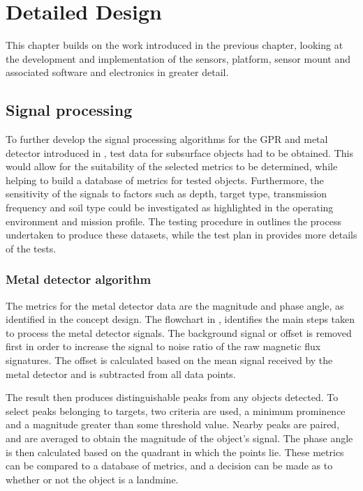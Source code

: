\documentclass[main.tex]{subfiles}
\begin{document}
\chapter{Detailed Design}

This chapter builds on the work introduced in the previous chapter, looking at the development and implementation of the sensors, platform, sensor mount and associated software and electronics in greater detail. 

\section{Signal processing}
To further develop the signal processing algorithms for the GPR and metal detector introduced in , test data for subsurface objects had to be obtained. This would allow for the suitability of the selected metrics to be determined, while helping to build a database of metrics for tested objects. Furthermore, the sensitivity of the signals to factors such as depth, target type, transmission frequency and soil type could be investigated as highlighted in the operating environment and mission profile. The testing procedure in  outlines the process undertaken to produce these datasets, while the test plan in  provides more details of the tests. 

\subsection{Metal detector algorithm}
The metrics for the metal detector data are the magnitude and phase angle, as identified in the concept design. The flowchart in , identifies the main steps taken to process the metal detector signals. The background signal or offset is removed first in order to increase the signal to noise ratio of the raw magnetic flux signatures. The offset is calculated based on the mean signal received by the metal detector and is subtracted from all data points. 

The result then produces distinguishable peaks from any objects detected. To select peaks belonging to targets, two criteria are used, a minimum prominence and a magnitude greater than some threshold value. Nearby peaks are paired, and are averaged to obtain the magnitude of the object’s signal. The phase angle is then calculated based on the quadrant in which the points lie. These metrics can be compared to a database of metrics, and a decision can be made as to whether or not the object is a landmine. 
\end{document}
